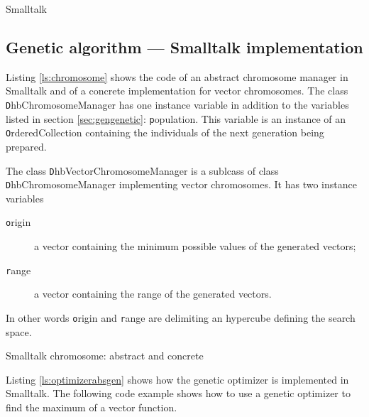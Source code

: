 \begin{displaycode}{Smalltalk}
\subsection{Genetic algorithm --- Smalltalk implementation}
 Listing \ref{ls:chromosome}
shows the code of an abstract chromosome manager in Smalltalk and
of a concrete implementation for vector chromosomes. The class
{\texttt DhbChromosomeManager} has one instance variable in addition
to the variables listed in section \ref{sec:gengenetic}: {\texttt
population}. This variable is an instance of an {\texttt
OrderedCollection} containing the individuals of the next
generation being prepared.

The class {\texttt DhbVectorChromosomeManager} is a sublcass of class
{\texttt DhbChromosomeManager} implementing vector chromosomes. It has
two instance variables
\begin{description}
  \item[\texttt origin] a vector containing the minimum possible
  values of the generated vectors;
  \item[\texttt range] a vector containing the range of the generated
  vectors.
\end{description}
In other words {\texttt origin} and {\texttt range} are delimiting an
hypercube defining the search space.

\begin{listing} Smalltalk chromosome: abstract and concrete \label{ls:chromosome}


\end{listing}
Listing \ref{ls:optimizerabsgen} shows how the genetic optimizer
is implemented in Smalltalk. The following code example shows how
to use a genetic optimizer to find the maximum of a vector
function.


\end{displaycode}
